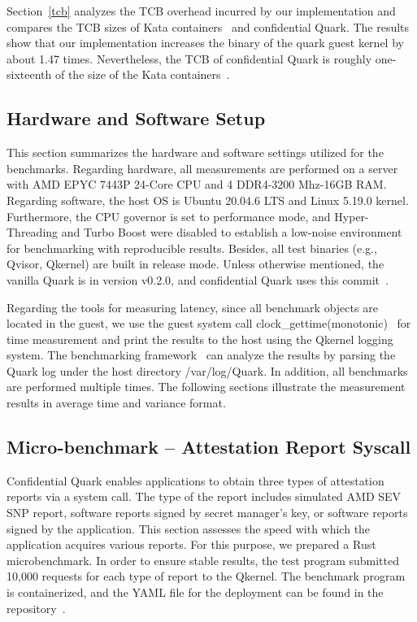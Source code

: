 Section~\ref{tcb} analyzes the \acrshort{TCB} overhead incurred by our implementation and compares the \acrshort{TCB} sizes of Kata containers~\cite*{Kata-Containers} and confidential Quark. The results show that our implementation increases the binary of the quark guest kernel by about 1.47 times. Nevertheless, 
the \acrshort{TCB} of confidential Quark is roughly one-sixteenth of the size of the Kata containers~\cite*{Kata-Containers}.



\subsection{Hardware and Software Setup}\label{Hardware_and_Software_Setup}

This section summarizes the hardware and software settings utilized for the benchmarks. Regarding hardware, all measurements are performed on a server with AMD EPYC 7443P 24-Core CPU and 4 DDR4-3200 Mhz-16GB RAM. Regarding software, the host OS is Ubuntu 20.04.6 LTS and Linux 5.19.0 kernel. 
Furthermore, the CPU governor is set to performance mode, and Hyper-Threading and Turbo Boost were disabled to establish a low-noise environment for benchmarking with reproducible results. Besides, all test binaries (e.g., Qvisor, Qkernel) are built in 
release mode. Unless otherwise mentioned, the vanilla Quark is in version v0.2.0, and confidential Quark uses this commit~\cite*{qualitativ_confidentail_quark}.


Regarding the tools for measuring latency, since all benchmark objects are located in the guest, we use the guest system call clock\_gettime(monotonic)~\cite*{clock_gettime} for time measurement and print the results to the host using the Qkernel logging system. The 
benchmarking framework~\cite*{benchamark_framework} can analyze the results by parsing the Quark log under the host directory /var/log/Quark. In addition, all benchmarks are performed multiple times. The following sections illustrate the measurement results in average time and variance format.

\subsection{Micro-benchmark – Attestation Report Syscall}\label{Attestation_Report_Syscall}

Confidential Quark enables applications to obtain three types of attestation reports via a system call. The type of the report includes simulated AMD SEV SNP report, software reports signed by secret manager's key, or software reports signed by the application. This section assesses the speed with which the 
application acquires various reports. For this purpose, we prepared a Rust microbenchmark\cite*{benchamark_Attestation_Report_Syscall}. In order to ensure stable results, the test program submitted 10,000 requests for each type of report to the Qkernel. The benchmark program is containerized, 
and the YAML file for the deployment can be found in the repository~\cite*{perf_test_repo}.

